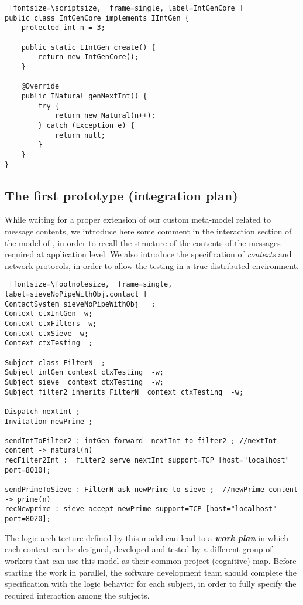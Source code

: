 \documentclass{../llncs}
\begin{document}
\begin{Verbatim} [fontsize=\scriptsize,  frame=single, label=IntGenCore ]
public class IntGenCore implements IIntGen {
	protected int n = 3;

	public static IIntGen create() {
		return new IntGenCore();
	}

	@Override
	public INatural genNextInt() {
		try {
			return new Natural(n++);
		} catch (Exception e) {
			return null;
		}
	}
}
\end{Verbatim}



\subsection{The first prototype (integration plan)}
While waiting for a proper extension of our custom meta-model related to message contents, we introduce here some comment in the interaction section of the model of , in order to recall the structure of the contents of the messages required at application level.
%
We also introduce the specification of \textit{contexts} and network protocols, in order to allow the testing in a true distributed environment.

\medskip 
\begin{Verbatim} [fontsize=\footnotesize,  frame=single, label=sieveNoPipeWithObj.contact ]
ContactSystem sieveNoPipeWithObj   ; 
Context ctxIntGen -w;
Context ctxFilters -w;
Context ctxSieve -w;
Context ctxTesting  ;
   
Subject class FilterN  ;   
Subject intGen context ctxTesting  -w;           
Subject sieve  context ctxTesting  -w;  
Subject filter2 inherits FilterN  context ctxTesting  -w;       
            
Dispatch nextInt ;    
Invitation newPrime ; 

sendIntToFilter2 : intGen forward  nextInt to filter2 ; //nextInt content -> natural(n)
recFilter2Int :  filter2 serve nextInt support=TCP [host="localhost" port=8010];

sendPrimeToSieve : FilterN ask newPrime to sieve ;	//newPrime content -> prime(n)
recNewprime : sieve accept newPrime support=TCP [host="localhost" port=8020];
\end{Verbatim}

The logic architecture defined by this \contact{} model can lead to a \textit{\textbf{work plan}} in which each context can be designed, developed and tested by a different group of workers that can use this model as their common project (cognitive) map. Before starting the work in parallel, the software development team should complete the specification with the logic behavior for each subject, in order to fully specify the required interaction among the subjects.
\end{document}

